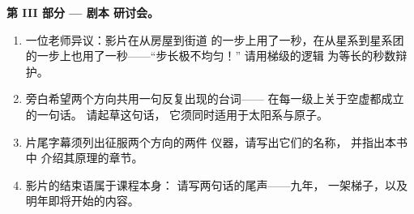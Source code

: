 \begin{problem}
\medskip\noindent\textbf{第 III 部分 --- 剧本
研讨会。}
\begin{enumerate}[resume]
  \item 一位老师异议：影片在从房屋到街道
        的一步上用了一秒，在从星系到星系团
        的一步上也用了一秒——“步长极不均匀！”
        请用梯级的逻辑
        为等长的秒数辩护。
  \item 旁白希望两个方向共用一句反复出现的台词——
        在每一级上关于空虚都成立的一句话。
        请起草这句话，
        它须同时适用于太阳系与原子。
  \item 片尾字幕须列出征服两个方向的两件
        仪器，请写出它们的名称，
        并指出本书中
        介绍其原理的章节。
  \item 影片的结束语属于课程本身：
        请写两句话的尾声——九年，
        一架梯子，以及明年即将开始的内容。
\end{enumerate}
\end{problem}
